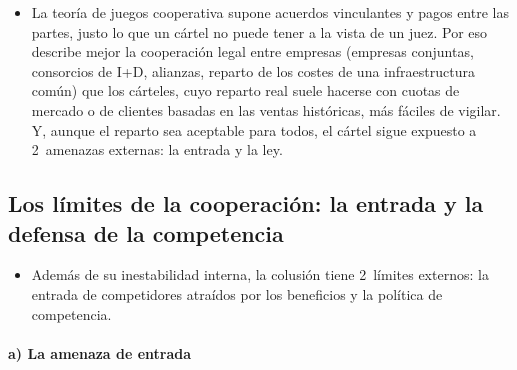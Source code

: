 \documentclass[11pt]{article}
\begin{document}
\begin{itemize}
\item La teoría de juegos cooperativa supone acuerdos vinculantes y pagos entre las partes, justo lo que un cártel no puede tener a la vista de un juez. Por eso describe mejor la cooperación legal entre empresas (empresas conjuntas, consorcios de I+D, alianzas, reparto de los costes de una infraestructura común) que los cárteles, cuyo reparto real suele hacerse con cuotas de mercado o de clientes basadas en las ventas históricas, más fáciles de vigilar. Y, aunque el reparto sea aceptable para todos, el cártel sigue expuesto a 2~amenazas externas: la entrada y la ley.
\end{itemize}

\subsection{Los límites de la cooperación: la entrada y la defensa de la competencia}\label{sec:limites-cooperacion}

\begin{itemize}
\item Además de su inestabilidad interna, la colusión tiene 2~límites externos: la entrada de competidores atraídos por los beneficios y la política de competencia.
\end{itemize}

\paragraph{a) La amenaza de entrada}
\end{document}
